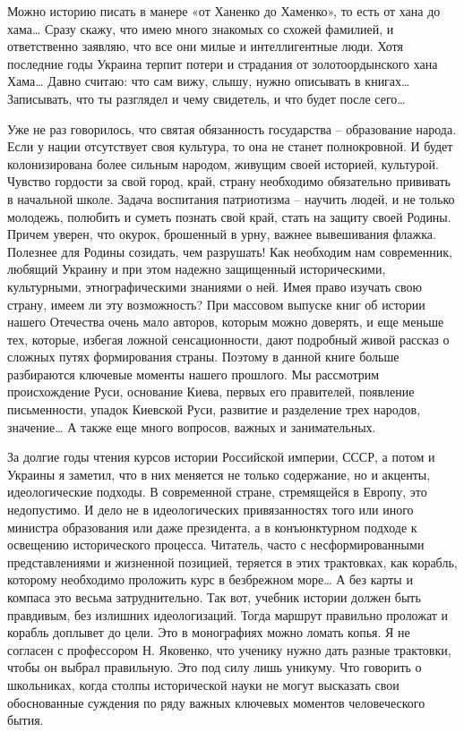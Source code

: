 Можно историю писать в манере «от Ханенко до Хаменко», то есть от хана до хама…
Сразу скажу, что имею много знакомых со схожей фамилией, и ответственно
заявляю, что все они милые и интеллигентные люди. Хотя последние годы Украина
терпит потери и страдания от золотоордынского хана Хама… Давно считаю: что сам
вижу, слышу, нужно описывать в книгах… Записывать, что ты разглядел и чему
свидетель, и что будет после сего…

Уже не раз говорилось, что святая обязанность государства – образование народа.
Если у нации отсутствует своя культура, то она не станет полнокровной. И будет
колонизирована более сильным народом, живущим своей историей, культурой.
Чувство гордости за свой город, край, страну необходимо обязательно прививать в
начальной школе. Задача воспитания патриотизма – научить людей, и не только
молодежь, полюбить и суметь познать свой край, стать на защиту своей Родины.
Причем уверен, что окурок, брошенный в урну, важнее вывешивания флажка.
Полезнее для Родины созидать, чем разрушать! Как необходим нам современник,
любящий Украину и при этом надежно защищенный историческими, культурными,
этнографическими знаниями о ней. Имея право изучать свою страну, имеем ли эту
возможность? При массовом выпуске книг об истории нашего Отечества очень мало
авторов, которым можно доверять, и еще меньше тех, которые, избегая ложной
сенсационности, дают подробный живой рассказ о сложных путях формирования
страны. Поэтому в данной книге больше разбираются ключевые моменты нашего
прошлого. Мы рассмотрим происхождение Руси, основание Киева, первых его
правителей, появление письменности, упадок Киевской Руси, развитие и разделение
трех народов, значение… А также еще много вопросов, важных и занимательных.

За долгие годы чтения курсов истории Российской империи, СССР, а потом и
Украины я заметил, что в них меняется не только содержание, но и акценты,
идеологические подходы. В современной стране, стремящейся в Европу, это
недопустимо. И дело не в идеологических привязанностях того или иного министра
образования или даже президента, а в конъюнктурном подходе к освещению
исторического процесса. Читатель, часто с несформированными представлениями и
жизненной позицией, теряется в этих трактовках, как корабль, которому
необходимо проложить курс в безбрежном море… А без карты и компаса это весьма
затруднительно. Так вот, учебник истории должен быть правдивым, без излишних
идеологизаций. Тогда маршрут правильно проложат и корабль доплывет до цели. Это
в монографиях можно ломать копья. Я не согласен с профессором Н. Яковенко, что
ученику нужно дать разные трактовки, чтобы он выбрал правильную. Это под силу
лишь уникуму. Что говорить о школьниках, когда столпы исторической науки не
могут высказать свои обоснованные суждения по ряду важных ключевых моментов
человеческого бытия.
	
